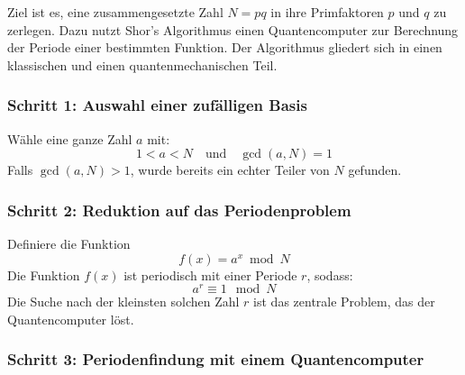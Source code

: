 \noindent
Ziel ist es, eine zusammengesetzte Zahl \( N = pq \) in ihre Primfaktoren \( p \) und \( q \) zu zerlegen. Dazu nutzt Shor's Algorithmus einen Quantencomputer zur Berechnung der Periode einer bestimmten Funktion. Der Algorithmus gliedert sich in einen klassischen und einen quantenmechanischen Teil.

\subsubsection*{Schritt 1: Auswahl einer zufälligen Basis}
Wähle eine ganze Zahl \( a \) mit:
\[
1 < a < N \quad \text{und} \quad \gcd(a, N) = 1
\]
Falls \( \gcd(a, N) > 1 \), wurde bereits ein echter Teiler von \( N \) gefunden.

\subsubsection*{Schritt 2: Reduktion auf das Periodenproblem}
Definiere die Funktion
\[
f(x) = a^x \bmod N
\]
Die Funktion \( f(x) \) ist periodisch mit einer Periode \( r \), sodass:
\[
a^r \equiv 1 \mod N
\]
Die Suche nach der kleinsten solchen Zahl \( r \) ist das zentrale Problem, das der Quantencomputer löst.

\subsubsection*{Schritt 3: Periodenfindung mit einem Quantencomputer}

